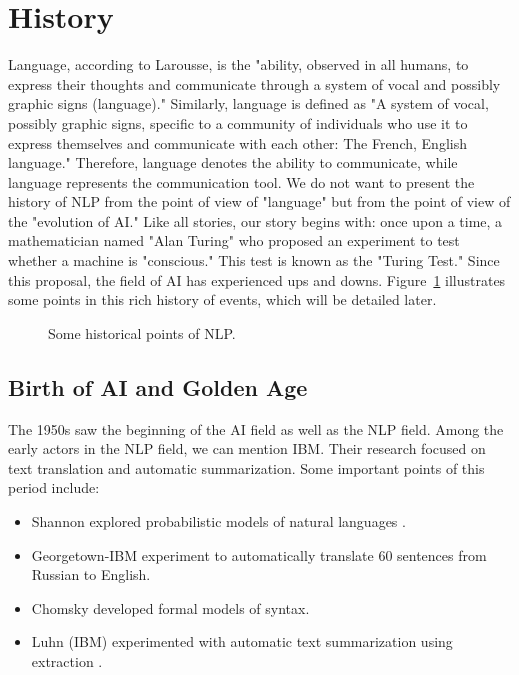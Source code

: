 \documentclass{KBook}
\begin{document}
\section{History}

Language, according to Larousse, is the "ability, observed in all humans, to express their thoughts and communicate through a system of vocal and possibly graphic signs (language)." Similarly, language is defined as "A system of vocal, possibly graphic signs, specific to a community of individuals who use it to express themselves and communicate with each other: The French, English language." Therefore, language denotes the ability to communicate, while language represents the communication tool. We do not want to present the history of NLP from the point of view of "language" but from the point of view of the "evolution of AI." Like all stories, our story begins with: once upon a time, a mathematician named "Alan Turing" who proposed an experiment to test whether a machine is "conscious." This test is known as the "Turing Test." Since this proposal, the field of AI has experienced ups and downs. Figure~\ref{fig:history} illustrates some points in this rich history of events, which will be detailed later.

\begin{figure}[ht]
	\centering
	\caption{Some historical points of NLP.}
	\label{fig:history}
\end{figure}

\subsection{Birth of AI and Golden Age}

The 1950s saw the beginning of the AI field as well as the NLP field. Among the early actors in the NLP field, we can mention IBM. Their research focused on text translation and automatic summarization. Some important points of this period include:
\begin{itemize}
	\item {} Shannon explored probabilistic models of natural languages \cite{1951-shannon}.
	\item {} Georgetown-IBM experiment to automatically translate 60 sentences from Russian to English.
	\item {} Chomsky developed formal models of syntax.
	\item {} Luhn (IBM) experimented with automatic text summarization using extraction \cite{1958-luhn}.
\end{itemize}
\end{document}
